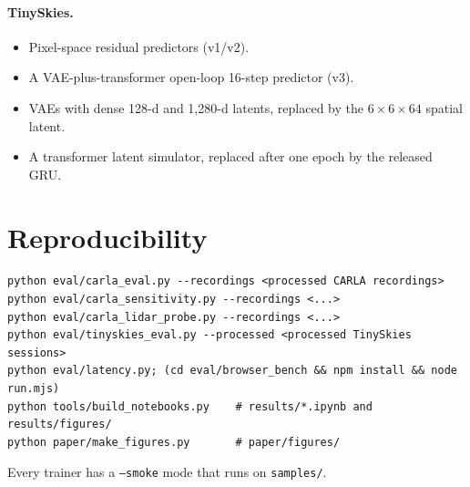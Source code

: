 \documentclass[11pt]{article}
\begin{document}
\paragraph{TinySkies.}
\begin{itemize}
  \item Pixel-space residual predictors (v1/v2).
  \item A VAE-plus-transformer open-loop 16-step predictor (v3).
  \item VAEs with dense 128-d and 1,280-d latents, replaced by the $6\times6\times64$ spatial latent.
  \item A transformer latent simulator, replaced after one epoch by the released GRU.
\end{itemize}

\section{Reproducibility}
\label{app:repro}

{\small
\begin{verbatim}
python eval/carla_eval.py --recordings <processed CARLA recordings>
python eval/carla_sensitivity.py --recordings <...>
python eval/carla_lidar_probe.py --recordings <...>
python eval/tinyskies_eval.py --processed <processed TinySkies sessions>
python eval/latency.py; (cd eval/browser_bench && npm install && node run.mjs)
python tools/build_notebooks.py    # results/*.ipynb and results/figures/
python paper/make_figures.py       # paper/figures/
\end{verbatim}
}

\noindent Every trainer has a \texttt{--smoke} mode that runs on \texttt{samples/}.
\end{document}
